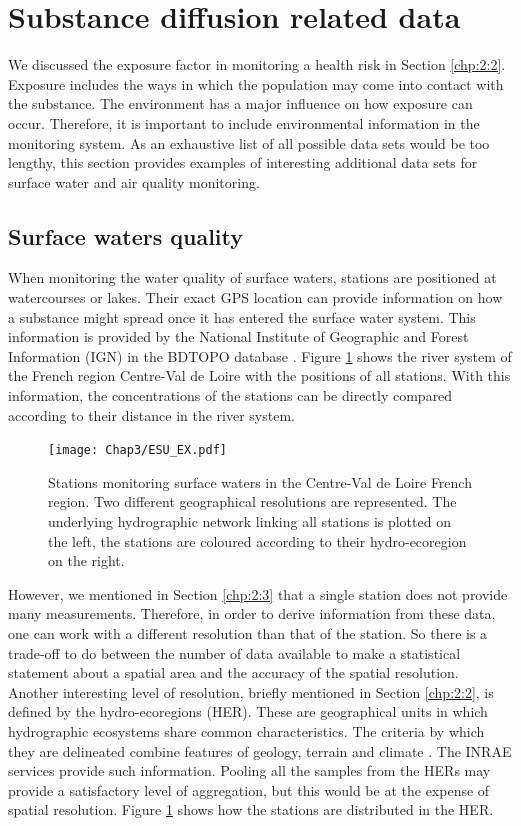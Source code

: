 \section{Substance diffusion related data}\label{chp:2:4}

We discussed the exposure factor in monitoring a health risk in Section \ref{chp:2:2}. Exposure includes the ways in which the population may come into contact with the substance. The environment has a major influence on how exposure can occur. Therefore, it is important to include environmental information in the monitoring system. As an exhaustive list of all possible data sets would be too lengthy, this section provides examples of interesting additional data sets for surface water and air quality monitoring.

\subsection{Surface waters quality}

When monitoring the water quality of surface waters, stations are positioned at watercourses or lakes. Their exact GPS location can provide information on how a substance might spread once it has entered the surface water system. This information is provided by the National Institute of Geographic and Forest Information (IGN) in the BDTOPO database \citep{BDTOPO}. Figure \ref{fig:esu_ex} shows the river system of the French region Centre-Val de Loire with the positions of all stations. With this information, the concentrations of the stations can be directly compared according to their distance in the river system. 

\begin{figure}[ht]
    \centering
    \texttt{[image: Chap3/ESU\_EX.pdf]}
    \caption{Stations monitoring surface waters in the Centre-Val de Loire French region. Two different geographical resolutions are represented. The underlying hydrographic network linking all stations is plotted on the left, the stations are coloured according to their hydro-ecoregion on the right.}
    \label{fig:esu_ex}
\end{figure}

However, we mentioned in Section \ref{chp:2:3} that a single station does not provide many measurements. Therefore, in order to derive information from these data, one can work with a different resolution than that of the station. So there is a trade-off to do between the number of data available to make a statistical statement about a spatial area and the accuracy of the spatial resolution. Another interesting level of resolution, briefly mentioned in Section \ref{chp:2:2}, is defined by the hydro-ecoregions (HER). These are geographical units in which hydrographic ecosystems share common characteristics. The criteria by which they are delineated combine features of geology, terrain and climate \cite{wasson:hal-02580774}. The INRAE services provide such information. Pooling all the samples from the HERs may provide a satisfactory level of aggregation, but this would be at the expense of spatial resolution. Figure \ref{fig:esu_ex} shows how the stations are distributed in the HER.

